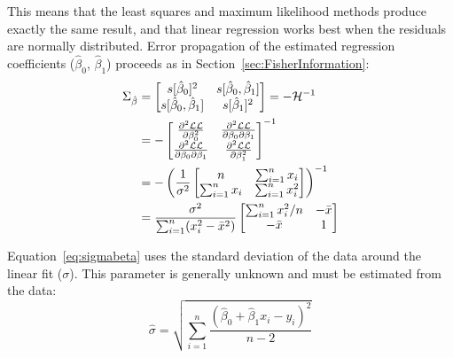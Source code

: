 This means that the least squares and maximum likelihood methods
produce exactly the same result, and that linear regression works best
when the residuals are normally distributed. Error propagation of the
estimated regression coefficients ($\hat{\beta}_0$, $\hat{\beta}_1$)
proceeds as in Section~\ref{sec:FisherInformation}:
\begin{equation}
  \begin{split}
    \Sigma_{\hat{\beta}} & = 
  \left[
    \begin{array}{@{}cc@{}}
      s[\hat{\beta}_0]^2 & s[\hat{\beta}_0,\hat{\beta}_1] \\
      s[\hat{\beta}_0,\hat{\beta}_1] & s[\hat{\beta}_1]^2 \\
    \end{array}
    \right] = 
  -\mathcal{H}^{-1} \\
  & =
    -\left[
      \begin{array}{@{}cc@{}}
        \frac{\partial^2{\mathcal{LL}}}{\partial{\beta_0^2}} &
        \frac{\partial^2{\mathcal{LL}}}{\partial{\beta_0}\partial{\beta_1}} \\
        \frac{\partial^2{\mathcal{LL}}}{\partial{\beta_0}\partial{\beta_1}} &
        \frac{\partial^2{\mathcal{LL}}}{\partial{\beta_1^2}}
      \end{array}
      \right]^{-1} \\
    & = -\left(\frac{1}{\sigma^2}
    \left[
      \begin{array}{@{}cc@{}}
        n & \sum_{i=1}^{n}x_i \\
        \sum_{i=1}^{n}x_i & \sum_{i=1}^{n}x_i^2
      \end{array}
      \right]\right)^{-1} \\
    & =
    \frac{\sigma^2}{\sum_{i=1}^{n}(x_i^2-\bar{x}^2)}
    \left[
      \begin{array}{@{}cc@{}}
        \sum_{i=1}^{n}x_i^2/n & -\bar{x} \\
        -\bar{x} & 1
      \end{array}
      \right]
  \end{split}
  \label{eq:sigmabeta}
\end{equation}

Equation~\ref{eq:sigmabeta} uses the standard deviation of the data
around the linear fit ($\sigma$). This parameter is generally unknown
and must be estimated from the data:
\begin{equation}
  \hat{\sigma} = \sqrt{\sum\limits_{i=1}^{n}
    \frac{(\hat{\beta}_0+\hat{\beta}_1x_i-y_i)^2}{n-2}}
  \label{eq:sigmahatregression}
\end{equation}

